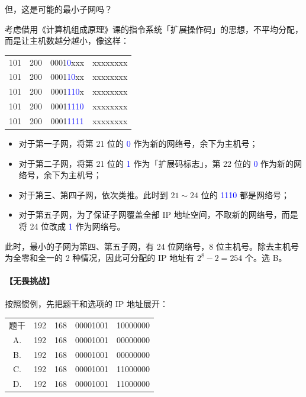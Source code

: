 \documentclass[UTF8]{ctexart}
\newcommand\col[1]{\textcolor{green!50!black}{#1}}
\newcommand\coll[1]{\textcolor{blue}{#1}}
\newcommand\dotting{\ .\ }
\newcommand\Emph[1]{\colorbox{green!10}{\textcolor{green!30!black}{#1}}}
\begin{document}
但，这是可能的\Emph{最小}子网吗？

考虑借用《计算机组成原理》课的指令系统「扩展操作码」的思想，不平均分配，而是让主机数\Emph{越分越小}，像这样：

\begin{table}[H]
    \centering
    \begin{tabular}{c@{\dotting}c@{\dotting}c@{\dotting}c}
        \col{101} & \col{200} & \col{0001}\coll{0}xxx & xxxxxxxx \\
        \col{101} & \col{200} & \col{0001}\coll{10}xx & xxxxxxxx \\
        \col{101} & \col{200} & \col{0001}\coll{110}x & xxxxxxxx \\
        \col{101} & \col{200} & \col{0001}\coll{1110} & xxxxxxxx \\
        \col{101} & \col{200} & \col{0001}\coll{1111} & xxxxxxxx \\
    \end{tabular}
\end{table}

\begin{itemize}
    \item 对于第一子网，将第 21 位的 \coll{0} 作为新的网络号，余下为主机号；
    \item 对于第二子网，将第 21 位的 \coll{1} 作为「扩展码标志」，第 22 位的 \coll{0} 作为新的网络号，余下为主机号；
    \item 对于第三、第四子网，依次类推。此时到 $21\sim 24$ 位的 \coll{1110} 都是网络号；
    \item 对于第五子网，为了保证子网覆盖全部 IP 地址空间，不取新的网络号，而是将 24 位改成 \coll{1} 作为网络号。
\end{itemize}

此时，最小的子网为第四、第五子网，有 24 位网络号，8 位主机号。除去主机号为全零和全一的 2 种情况，因此可分配的 IP 地址有 $2^8-2=254$ 个。选 B。

\paragraph{【无畏挑战】} 按照惯例，先把题干和选项的 IP 地址展开：

\begin{table}[H]
    \centering
    \begin{tabular}{cc@{\dotting}c@{\dotting}c@{\dotting}c}
        题干 & \col{192} & \col{168} & \col{00001001} & \col{10}000000 \\
        A.   & \col{192} & \col{168} & \col{00001001} & \col{0}0000000 \\
        B.   & \col{192} & \col{168} & \col{00001001} & \col{00}000000 \\
        C.   & \col{192} & \col{168} & \col{00001001} & \col{11}000000 \\
        D.   & \col{192} & \col{168} & \col{00001001} & \col{110}00000 \\
    \end{tabular}
\end{table}
\end{document}
